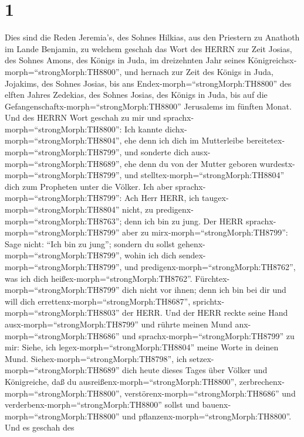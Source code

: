 \hypertarget{section}{%
\section{1}\label{section}}

 Dies sind die Reden Jeremia's, des Sohnes Hilkias, aus den
Priestern zu Anathoth im Lande Benjamin,  zu welchem geschah
das Wort des HERRN zur Zeit Josias, des Sohnes Amons, des Königs in
Juda, im dreizehnten Jahr seines
Königreichsx-morph=``strongMorph:TH8800'',  und hernach zur
Zeit des Königs in Juda, Jojakims, des Sohnes Josias, bis ans
Endex-morph=``strongMorph:TH8800'' des elften Jahres Zedekias, des
Sohnes Josias, des Königs in Juda, bis auf die
Gefangenschaftx-morph=``strongMorph:TH8800'' Jerusalems im fünften
Monat.  Und des HERRN Wort geschah zu mir und
sprachx-morph=``strongMorph:TH8800'':  Ich kannte
dichx-morph=``strongMorph:TH8804'', ehe denn ich dich im Mutterleibe
bereitetex-morph=``strongMorph:TH8799'', und sonderte dich
ausx-morph=``strongMorph:TH8689'', ehe denn du von der Mutter geboren
wurdestx-morph=``strongMorph:TH8799'', und
stelltex-morph=``strongMorph:TH8804'' dich zum Propheten unter die
Völker.  Ich aber sprachx-morph=``strongMorph:TH8799'': Ach
Herr HERR, ich taugex-morph=``strongMorph:TH8804'' nicht, zu
predigenx-morph=``strongMorph:TH8763''; denn ich bin zu jung.
 Der HERR sprachx-morph=``strongMorph:TH8799'' aber zu
mirx-morph=``strongMorph:TH8799'': Sage nicht: ``Ich bin zu jung'';
sondern du sollst gehenx-morph=``strongMorph:TH8799'', wohin ich dich
sendex-morph=``strongMorph:TH8799'', und
predigenx-morph=``strongMorph:TH8762'', was ich dich
heißex-morph=``strongMorph:TH8762''. 
Fürchtex-morph=``strongMorph:TH8799'' dich nicht vor ihnen; denn ich bin
bei dir und will dich errettenx-morph=``strongMorph:TH8687'',
sprichtx-morph=``strongMorph:TH8803'' der HERR.  Und der
HERR reckte seine Hand ausx-morph=``strongMorph:TH8799'' und rührte
meinen Mund anx-morph=``strongMorph:TH8686'' und
sprachx-morph=``strongMorph:TH8799'' zu mir: Siehe, ich
legex-morph=``strongMorph:TH8804'' meine Worte in deinen Mund.
 Siehex-morph=``strongMorph:TH8798'', ich
setzex-morph=``strongMorph:TH8689'' dich heute dieses Tages über Völker
und Königreiche, daß du ausreißenx-morph=``strongMorph:TH8800'',
zerbrechenx-morph=``strongMorph:TH8800'',
verstörenx-morph=``strongMorph:TH8686'' und
verderbenx-morph=``strongMorph:TH8800'' sollst und
bauenx-morph=``strongMorph:TH8800'' und
pflanzenx-morph=``strongMorph:TH8800''.  Und es geschah des
